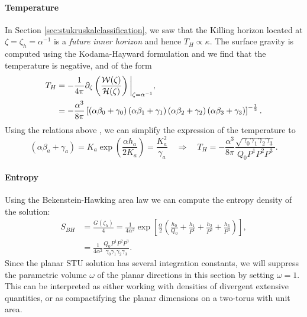 \paragraph{Temperature}
In Section \ref{sec:stukruskalclassification}, we saw that the Killing horizon located at $\zeta = \zeta_h = \alpha^{-1}$ is a \emph{future inner horizon} and hence $T_H \propto \kappa$. The surface gravity is computed using the Kodama-Hayward formulation  and we find that the temperature is negative, and of the form
\begin{equation}
\label{eq:STUtemp}
\begin{aligned}
        T_H &= -\frac{1}{4 \pi} \partial_\zeta \left(\frac{{\cal W}(\zeta)}{{\cal H} (\zeta)} \right) 
        \bigg|_{\zeta=\alpha^{-1}} , \\
        &= -\frac{\alpha^{3}}{8 \pi} \left[\left(\alpha  \beta _0+\gamma _0\right) \left(\alpha  \beta
   _1+\gamma _1\right) \left(\alpha  \beta _2+\gamma _2\right) \left(\alpha  \beta
   _3+\gamma _3\right) \right]^{-\frac{1}{2}}.
\end{aligned}
\end{equation}
Using the relations above ,  we can simplify the expression of the temperature to 
\begin{equation*}
    (\alpha \beta_a + \gamma_a) = K_a \exp\left(\frac{\alpha h_a}{2 K_a} \right) = \frac{K_a^2}{\gamma_a} \quad \Rightarrow \quad    T_H = -\frac{\alpha^3}{8 \pi} \frac{\sqrt{\gamma_0 \gamma_1 \gamma_2 \gamma_3}}{Q_0 P^1 P^2 P^3}.
\end{equation*}

\paragraph{Entropy} Using the Bekenstein-Hawking area law we can compute the entropy density of the solution:
\begin{equation*}
\begin{aligned}
        S_{BH} &= \frac{G(\zeta_h)}{4} = \frac{1}{4 \alpha^2} \exp\left[\frac{\alpha}{2} \left(\frac{h_0}{Q_0} + \frac{h_1}{P^1} + \frac{h_2}{P^2}+\frac{h_3}{P^3} \right) \right],  \\
        &= \frac{1}{4 \alpha^2} \frac{Q_0 P^1  P^2 P^3}{\gamma_0 \gamma_1 \gamma_2 \gamma_3}.
\end{aligned}
\end{equation*}
Since the planar STU solution has several integration constants, we will suppress the parametric volume $\omega$ of the planar directions in this section by setting $\omega=1$. This can be interpreted as either working with densities of divergent extensive quantities, or as compactifying the planar dimensions on a two-torus with unit area. 


